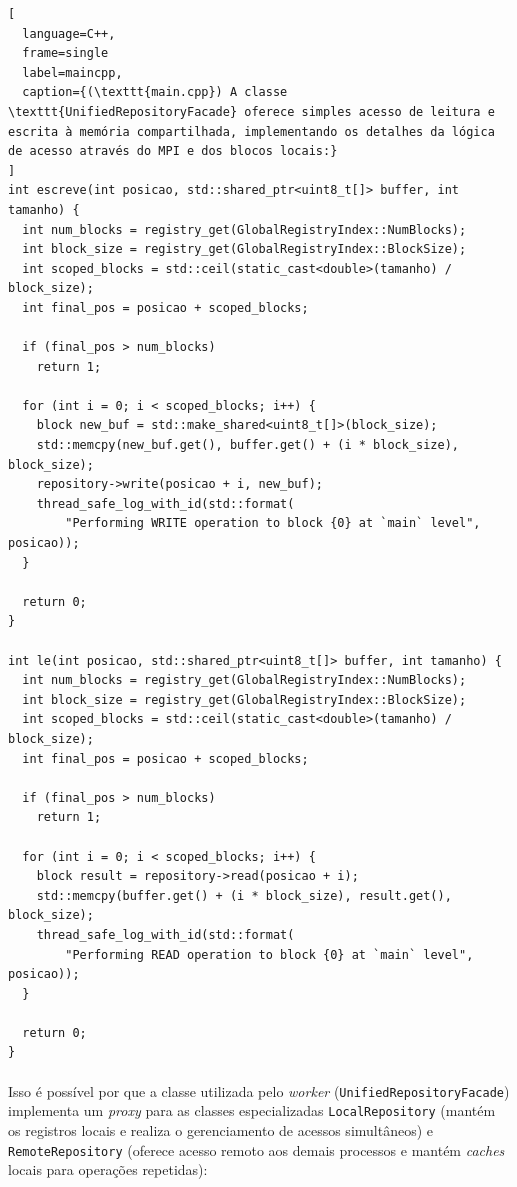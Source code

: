 \documentclass[12pt]{article}
\begin{document}
\begin{lstlisting}[
  language=C++,
  frame=single
  label=maincpp,
  caption={(\texttt{main.cpp}) A classe \texttt{UnifiedRepositoryFacade} oferece simples acesso de leitura e escrita à memória compartilhada, implementando os detalhes da lógica de acesso através do MPI e dos blocos locais:}
]
int escreve(int posicao, std::shared_ptr<uint8_t[]> buffer, int tamanho) {
  int num_blocks = registry_get(GlobalRegistryIndex::NumBlocks);
  int block_size = registry_get(GlobalRegistryIndex::BlockSize);
  int scoped_blocks = std::ceil(static_cast<double>(tamanho) / block_size);
  int final_pos = posicao + scoped_blocks;

  if (final_pos > num_blocks)
    return 1;

  for (int i = 0; i < scoped_blocks; i++) {
    block new_buf = std::make_shared<uint8_t[]>(block_size);
    std::memcpy(new_buf.get(), buffer.get() + (i * block_size), block_size);
    repository->write(posicao + i, new_buf);
    thread_safe_log_with_id(std::format(
        "Performing WRITE operation to block {0} at `main` level", posicao));
  }

  return 0;
}

int le(int posicao, std::shared_ptr<uint8_t[]> buffer, int tamanho) {
  int num_blocks = registry_get(GlobalRegistryIndex::NumBlocks);
  int block_size = registry_get(GlobalRegistryIndex::BlockSize);
  int scoped_blocks = std::ceil(static_cast<double>(tamanho) / block_size);
  int final_pos = posicao + scoped_blocks;

  if (final_pos > num_blocks)
    return 1;

  for (int i = 0; i < scoped_blocks; i++) {
    block result = repository->read(posicao + i);
    std::memcpy(buffer.get() + (i * block_size), result.get(), block_size);
    thread_safe_log_with_id(std::format(
        "Performing READ operation to block {0} at `main` level", posicao));
  }

  return 0;
}
\end{lstlisting}

\paragraph{}
Isso é possível por que a classe utilizada pelo \textit{worker} (\texttt{UnifiedRepositoryFacade}) implementa um
\textit{proxy} para as classes especializadas \texttt{LocalRepository} (mantém os registros locais e realiza o
gerenciamento de acessos simultâneos) e \texttt{RemoteRepository} (oferece acesso remoto aos demais processos e mantém
\textit{caches} locais para operações repetidas):
\end{document}
